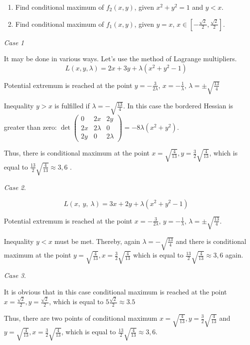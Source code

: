 \documentclass[addpoints, answers]{exam} %
\begin{document}
\begin{questions}
\begin{solution}
\begin{enumerate}
\item  Find conditional maximum of $f_2\left(x,y\right)$, given $x^2+y^2=1$ and $y<x$.

\item  Find conditional maximum of $f_1\left(x,y\right)$, given $y=x$, $x\in \left[-\frac{\sqrt{2}}{2},\frac{\sqrt{2}}{2}\right]$.
\end{enumerate}

\textit{Case 1}

It may be done in various ways. Let's use the method of Lagrange multipliers.
\[L\left(x, y, \lambda\right)=2x+3y+\lambda \left(x^2+y^2-1\right)\] 

Potential extremum is reached at the point $y=-\frac{3}{2\lambda}$, $x=-\frac{1}{\lambda}$, $\lambda =\pm \sqrt{\frac{13}{4}}$

Inequality $y>x$ is fulfilled if $\lambda =-\sqrt{\frac{13}{4}}$.  In this case the bordered Hessian is greater than zero: $\det\left( \begin{array}{ccc}
0 & 2x & 2y \\ 
2x & 2\lambda & 0 \\ 
2y & 0 & 2\lambda \end{array}
\right)=-8\lambda\left(x^2+y^2\right)$. 

Thus, there is conditional maximum at the point $x=\sqrt{\frac{4}{13}},y=\frac{3}{2}\sqrt{\frac{4}{13}}$, which is equal to $\frac{13}{2}\sqrt{\frac{4}{13}}\approx 3,6$ .

\textit{Case 2}.

\[L\left(x,\ y,\ \lambda\right)=3x+2y+\lambda\left(x^2+y^2-1\right)\] 

Potential extremum is reached at the point $x=-\frac{3}{2\lambda}$, $y=-\frac{1}{\lambda}$, $\lambda=\pm \sqrt{\frac{13}{4}}$. 

Inequality $y<x$ must be met. Thereby, again $\lambda=-\sqrt{\frac{13}{4}}$ and there is conditional maximum at the point $y=\sqrt{\frac{4}{13}},x=\frac{3}{2}\sqrt{\frac{4}{13}}$ which is equal to  $\frac{13}{2}\sqrt{\frac{4}{13}}\approx 3,6$ again.

\textit{Case 3}.

It is obvious that in this case conditional maximum is reached at the point $x=\frac{\sqrt{2}}{2},y=\frac{\sqrt{2}}{2}$, which is equal to $5\frac{\sqrt{2}}{2}\approx 3.5$

Thus, there are two points of conditional maximum $x=\sqrt{\frac{4}{13}},y=\frac{3}{2}\sqrt{\frac{4}{13}}$ and $y=\sqrt{\frac{4}{13}},x=\frac{3}{2}\sqrt{\frac{4}{13}}$, which is equal to $\frac{13}{2}\sqrt{\frac{4}{13}}\approx 3,6$.



\end{solution}
\end{questions}
\end{document}
